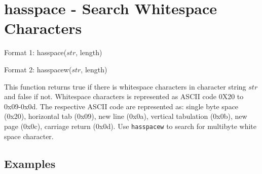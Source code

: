 
%

\section{hasspace - Search Whitespace Characters\label{sect:hasspace}}

Format 1: hasspace($str$, length)

Format 2: hasspacew($str$, length)

This function returns true if there is whitespace characters in character string $str$ and false if not. Whitespace characters is represented as ASCII code 0X20 to 0x09-0x0d. The respective ASCII code are represented as: single byte space (0x20), horizontal tab (0x09), new line (0x0a), vertical tabulation (0x0b), new page (0x0c), carriage return (0x0d). Use \verb|hasspacew| to search for multibyte white space character.


\subsection*{Examples}


%

